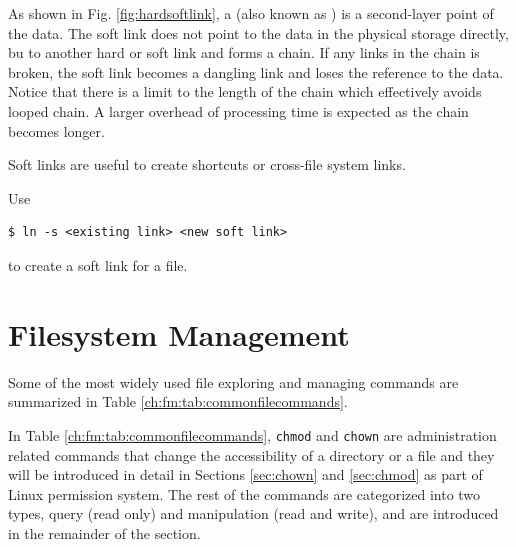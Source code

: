 As shown in Fig. \ref{fig:hardsoftlink}, a  (also known as ) is a second-layer point of the data. The soft link does not point to the data in the physical storage directly, bu to another hard or soft link and forms a chain. If any links in the chain is broken, the soft link becomes a dangling link and loses the reference to the data. Notice that there is a limit to the length of the chain which effectively avoids looped chain. A larger overhead of processing time is expected as the chain becomes longer.

Soft links are useful to create shortcuts or cross-file system links.

Use
\begin{lstlisting}
$ ln -s <existing link> <new soft link>
\end{lstlisting}
to create a soft link for a file.

\section{Filesystem Management} \label{ch:fm:sec:filemanagement}

Some of the most widely used file exploring and managing commands are summarized in Table \ref{ch:fm:tab:commonfilecommands}. 

In Table \ref{ch:fm:tab:commonfilecommands}, \verb|chmod| and \verb|chown| are administration related commands that change the accessibility of a directory or a file and they will be introduced in detail in Sections \ref{sec:chown} and \ref{sec:chmod} as part of Linux permission system. The rest of the commands are categorized into two types, query (read only) and manipulation (read and write), and are introduced in the remainder of the section.

